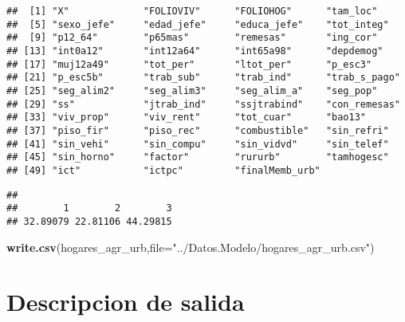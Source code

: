 \documentclass[11pt,]{article}
\newenvironment{Shaded}{\begin{snugshade}}{\end{snugshade}}
\newcommand{\KeywordTok}[1]{\textcolor[rgb]{0.13,0.29,0.53}{\textbf{#1}}}
\newcommand{\DataTypeTok}[1]{\textcolor[rgb]{0.13,0.29,0.53}{#1}}
\newcommand{\DecValTok}[1]{\textcolor[rgb]{0.00,0.00,0.81}{#1}}
\newcommand{\StringTok}[1]{\textcolor[rgb]{0.31,0.60,0.02}{#1}}
\newcommand{\OperatorTok}[1]{\textcolor[rgb]{0.81,0.36,0.00}{\textbf{#1}}}
\newcommand{\NormalTok}[1]{#1}
\begin{document}
\begin{verbatim}
##  [1] "X"             "FOLIOVIV"      "FOLIOHOG"      "tam_loc"      
##  [5] "sexo_jefe"     "edad_jefe"     "educa_jefe"    "tot_integ"    
##  [9] "p12_64"        "p65mas"        "remesas"       "ing_cor"      
## [13] "int0a12"       "int12a64"      "int65a98"      "depdemog"     
## [17] "muj12a49"      "tot_per"       "ltot_per"      "p_esc3"       
## [21] "p_esc5b"       "trab_sub"      "trab_ind"      "trab_s_pago"  
## [25] "seg_alim2"     "seg_alim3"     "seg_alim_a"    "seg_pop"      
## [29] "ss"            "jtrab_ind"     "ssjtrabind"    "con_remesas"  
## [33] "viv_prop"      "viv_rent"      "tot_cuar"      "bao13"        
## [37] "piso_fir"      "piso_rec"      "combustible"   "sin_refri"    
## [41] "sin_vehi"      "sin_compu"     "sin_vidvd"     "sin_telef"    
## [45] "sin_horno"     "factor"        "rururb"        "tamhogesc"    
## [49] "ict"           "ictpc"         "finalMemb_urb"
\end{verbatim}

\begin{Shaded}
\end{Shaded}

\begin{verbatim}
## 
##        1        2        3 
## 32.89079 22.81106 44.29815
\end{verbatim}

\begin{Shaded}
\begin{Highlighting}[]
\KeywordTok{write.csv}\NormalTok{(hogares_agr_urb,}\DataTypeTok{file=}\StringTok{"../Datos.Modelo/hogares_agr_urb.csv"}\NormalTok{)}
\end{Highlighting}
\end{Shaded}

\section{Descripcion de salida}\label{descripcion-de-salida}
\end{document}
